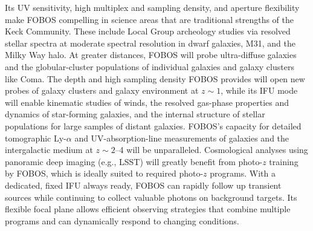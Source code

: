 Its UV sensitivity, high multiplex and sampling density, and aperture
flexibility make FOBOS compelling in science areas that are
traditional strengths of the Keck Community. These include Local
Group archeology studies via resolved stellar spectra at moderate
spectral resolution in dwarf galaxies, M31, and the Milky Way halo.
At greater distances, FOBOS will probe ultra-diffuse galaxies and the
globular-cluster populations of individual galaxies and galaxy
clusters like Coma. The depth and high sampling density FOBOS
provides will open new probes of galaxy clusters and galaxy
environment at $z \sim 1$, while its IFU mode will enable kinematic
studies of winds, the resolved gas-phase properties and dynamics of
star-forming galaxies, and the internal structure of stellar
populations for large samples of distant galaxies. FOBOS's capacity
for detailed tomographic Ly-$\alpha$ and UV-absorption-line
measurements of galaxies and the intergalactic medium at $z \sim
2$--4 will be unparalleled. Cosmological analyses using panoramic
deep imaging (e.g., LSST) will greatly benefit from photo-$z$
training by FOBOS, which is ideally suited to required photo-$z$
programs. With a dedicated, fixed IFU always ready, FOBOS can rapidly
follow up transient sources while continuing to collect valuable
photons on background targets. Its flexible focal plane allows
efficient observing strategies that combine multiple programs and can
dynamically respond to changing conditions.





